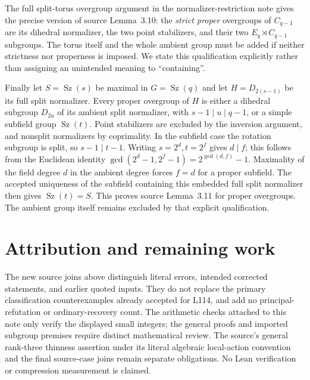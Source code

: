 \documentclass[11pt,a4paper]{article}
\newcommand{\Sz}{\operatorname{Sz}}
\begin{document}
The full split-torus overgroup argument in the normalizer-restriction
note gives the precise version of source Lemma~3.10: the \emph{strict
proper} overgroups of $C_{q-1}$ are its dihedral normalizer, the two
point stabilizers, and their two $E_q\rtimes C_{q-1}$ subgroups.
The torus itself and the whole ambient group must be added if neither
strictness nor properness is imposed. We state this qualification
explicitly rather than assigning an unintended meaning to ``containing''.

Finally let $S=\Sz(s)$ be maximal in $G=\Sz(q)$ and let
$H=D_{2(s-1)}$ be its full split normalizer. Every proper overgroup of
$H$ is either a dihedral subgroup $D_{2u}$ of its ambient split normalizer,
with $s-1\mid u\mid q-1$, or a simple subfield group $\Sz(t)$.
Point stabilizers are excluded by the inversion argument, and nonsplit
normalizers by coprimality. In the subfield case the rotation subgroup
is split, so $s-1\mid t-1$. Writing $s=2^d,t=2^f$ gives $d\mid f$;
this follows from the Euclidean identity
$\gcd(2^d-1,2^f-1)=2^{\gcd(d,f)}-1$.
Maximality of the field degree $d$ in the ambient degree forces $f=d$
for a proper subfield. The accepted uniqueness of the subfield containing
this embedded full split normalizer then gives $\Sz(t)=S$.
This proves source Lemma~3.11 for proper overgroups. The ambient group
itself remains excluded by that explicit qualification.

\section{Attribution and remaining work}
The new source joins above distinguish literal errors, intended corrected
statements, and earlier quoted inputs. They do not replace the primary
classification counterexamples already accepted for L114, and add no
principal-refutation or ordinary-recovery count. The arithmetic checks
attached to this note only verify the displayed small integers; the general
proofs and imported subgroup premises require distinct mathematical review.
The source's general rank-three thinness assertion under its literal
algebraic local-action convention and the final source-case joins remain
separate obligations. No Lean verification or compression measurement is
claimed.
\end{document}
